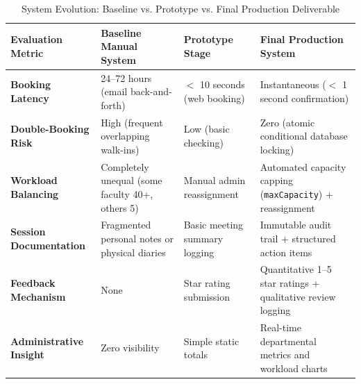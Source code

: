 \documentclass[11pt,a4paper]{article}
\begin{document}
\begin{table}[H]
\centering
\small
\begin{tabularx}{\textwidth}{p{3.0cm}p{3.8cm}p{3.8cm}X}
\toprule
\rowcolor{lightgray} \textbf{Evaluation Metric} & \textbf{Baseline Manual System} & \textbf{Prototype Stage} & \textbf{Final Production System} \\
\midrule
\textbf{Booking Latency} & 24--72 hours (email back-and-forth) & $<$ 10 seconds (web booking) & Instantaneous ($<$ 1 second confirmation) \\
\midrule
\textbf{Double-Booking Risk} & High (frequent overlapping walk-ins) & Low (basic checking) & Zero (atomic conditional database locking) \\
\midrule
\textbf{Workload Balancing} & Completely unequal (some faculty 40+, others 5) & Manual admin reassignment & Automated capacity capping (\texttt{maxCapacity}) + reassignment \\
\midrule
\textbf{Session Documentation} & Fragmented personal notes or physical diaries & Basic meeting summary logging & Immutable audit trail + structured action items \\
\midrule
\textbf{Feedback Mechanism} & None & Star rating submission & Quantitative 1--5 star ratings + qualitative review logging \\
\midrule
\textbf{Administrative Insight} & Zero visibility & Simple static totals & Real-time departmental metrics and workload charts \\
\bottomrule
\end{tabularx}
\caption{System Evolution: Baseline vs. Prototype vs. Final Production Deliverable}
\label{tab:comparison}
\end{table}

\end{document}
